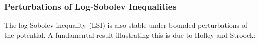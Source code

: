 \documentclass[11pt, twoside]{report}
\begin{document}

\subsubsection{Perturbations of Log-Sobolev Inequalities}

The log-Sobolev inequality (LSI) is also stable under bounded perturbations of the potential. A fundamental result illustrating this is due to Holley and Stroock:
\end{document}
